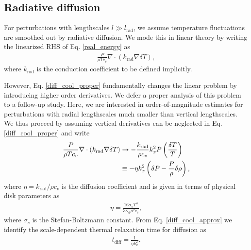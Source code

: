 \subsection{Radiative diffusion}
For perturbations with lengthscales $l\gg
l_\mathrm{rad}$, we assume  
temperature fluctuations are smoothed out by radiative diffusion. We
mode this in linear theory by writing the linearized RHS of
Eq. \ref{real_energy} as 
\begin{align}\label{diff_cool_proper}
  \frac{P}{\rho T c_v} \nabla\cdot\left(k_\mathrm{rad}\nabla\delta
    T\right),  
\end{align}
where $k_\mathrm{rad}$ is the conduction coefficient to be defined
implicitly. 

However, Eq. \ref{diff_cool_proper} fundamentally changes the linear problem by
introducing higher order derivatives. We defer a proper analysis of
this problem to a follow-up study. Here, we are interested in
order-of-magnitude estimates for perturbations with radial
lengthscales much smaller than vertical lengthscales. We thus proceed
by assuming vertical derivatives can be neglected in
Eq. \ref{diff_cool_proper} and write  
\begin{align}\label{diff_cool_approx}
  \frac{P}{\rho T c_v} \nabla\cdot\left(k_\mathrm{rad}\nabla\delta
    T\right) &\to -\frac{k_\mathrm{rad}}{\rho
    c_v}k_x^2P\left(\frac{\delta T}{T}\right)\notag\\
  &\equiv -\eta k_x^2 \left(\delta P - \frac{P}{\rho}\delta\rho\right), 
\end{align}
where $\eta=k_\mathrm{rad}/\rho c_v$ is the diffusion coefficient and
is given in terms of physical disk parameters as 
\begin{align}\label{eta_def}
  \eta = \frac{16\sigma_s T^3}{3\kappa_d\rho^2 c_v}, 
\end{align}
where $\sigma_s$ is the Stefan-Boltzmann constant. 
From Eq. \ref{diff_cool_approx} we identify the scale-dependent thermal relaxation
time for diffusion as 
\begin{align}\label{tc_diff_cool} 
  t_\mathrm{diff} = \frac{1}{\eta k_x^2}.%
\end{align}


